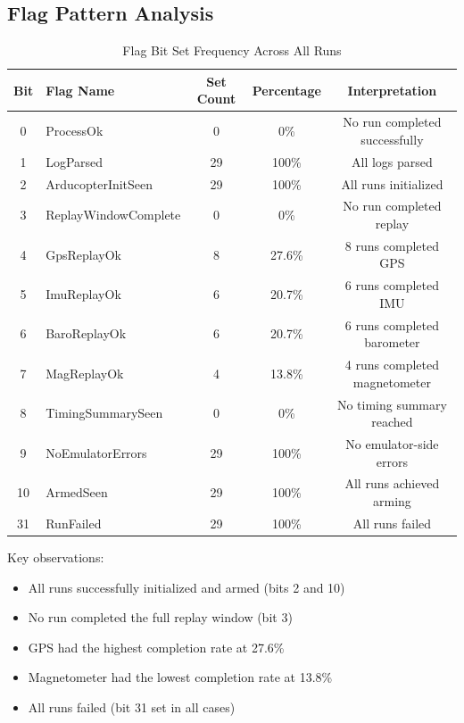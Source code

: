 \documentclass[11pt,a4paper]{article}
\begin{document}
\subsection{Flag Pattern Analysis}

\begin{table}[H]
\centering
\caption{Flag Bit Set Frequency Across All Runs}
\label{tab:flag_frequency}
\begin{tabular}{@{}clccc@{}}
\toprule
\textbf{Bit} & \textbf{Flag Name} & \textbf{Set Count} & \textbf{Percentage} & \textbf{Interpretation} \\
\midrule
0 & ProcessOk & 0 & 0\% & No run completed successfully \\
1 & LogParsed & 29 & 100\% & All logs parsed \\
2 & ArducopterInitSeen & 29 & 100\% & All runs initialized \\
3 & ReplayWindowComplete & 0 & 0\% & No run completed replay \\
4 & GpsReplayOk & 8 & 27.6\% & 8 runs completed GPS \\
5 & ImuReplayOk & 6 & 20.7\% & 6 runs completed IMU \\
6 & BaroReplayOk & 6 & 20.7\% & 6 runs completed barometer \\
7 & MagReplayOk & 4 & 13.8\% & 4 runs completed magnetometer \\
8 & TimingSummarySeen & 0 & 0\% & No timing summary reached \\
9 & NoEmulatorErrors & 29 & 100\% & No emulator-side errors \\
10 & ArmedSeen & 29 & 100\% & All runs achieved arming \\
31 & RunFailed & 29 & 100\% & All runs failed \\
\bottomrule
\end{tabular}
\end{table}

Key observations:
\begin{itemize}
  \item All runs successfully initialized and armed (bits 2 and 10)
  \item No run completed the full replay window (bit 3)
  \item GPS had the highest completion rate at 27.6\%
  \item Magnetometer had the lowest completion rate at 13.8\%
  \item All runs failed (bit 31 set in all cases)
\end{itemize}
\end{document}
